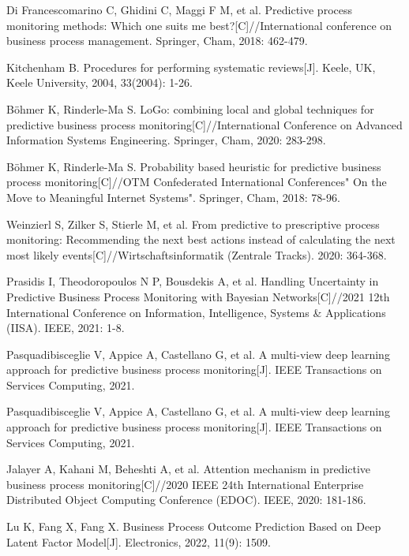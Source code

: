 \documentclass[runningheads]{llncs}
\begin{document}
	\newpage
	\begin{thebibliography}{99}
	
	Di Francescomarino C, Ghidini C, Maggi F M, et al. Predictive process monitoring methods: Which one suits me best?[C]//International conference on business process management. Springer, Cham, 2018: 462-479.
	
	Kitchenham B. Procedures for performing systematic reviews[J]. Keele, UK, Keele University, 2004, 33(2004): 1-26.
	
	Böhmer K, Rinderle-Ma S. LoGo: combining local and global techniques for predictive business process monitoring[C]//International Conference on Advanced Information Systems Engineering. Springer, Cham, 2020: 283-298.
	
	Böhmer K, Rinderle-Ma S. Probability based heuristic for predictive business process monitoring[C]//OTM Confederated International Conferences" On the Move to Meaningful Internet Systems". Springer, Cham, 2018: 78-96.
	
	Weinzierl S, Zilker S, Stierle M, et al. From predictive to prescriptive process monitoring: Recommending the next best actions instead of calculating the next most likely events[C]//Wirtschaftsinformatik (Zentrale Tracks). 2020: 364-368.
	
	Prasidis I, Theodoropoulos N P, Bousdekis A, et al. Handling Uncertainty in Predictive Business Process Monitoring with Bayesian Networks[C]//2021  12th International Conference on Information, Intelligence, Systems \& Applications (IISA). IEEE, 2021: 1-8.
	
	Pasquadibisceglie V, Appice A, Castellano G, et al. A multi-view deep learning approach for predictive business process monitoring[J]. IEEE Transactions on Services Computing, 2021.
	
	Pasquadibisceglie V, Appice A, Castellano G, et al. A multi-view deep learning approach for predictive business process monitoring[J]. IEEE Transactions on Services Computing, 2021.
	
	Jalayer A, Kahani M, Beheshti A, et al. Attention mechanism in predictive business process monitoring[C]//2020 IEEE 24th International Enterprise Distributed Object Computing Conference (EDOC). IEEE, 2020: 181-186.
	
	Lu K, Fang X, Fang X. Business Process Outcome Prediction Based on Deep Latent Factor Model[J]. Electronics, 2022, 11(9): 1509.
	

\end{thebibliography}
\end{document}
